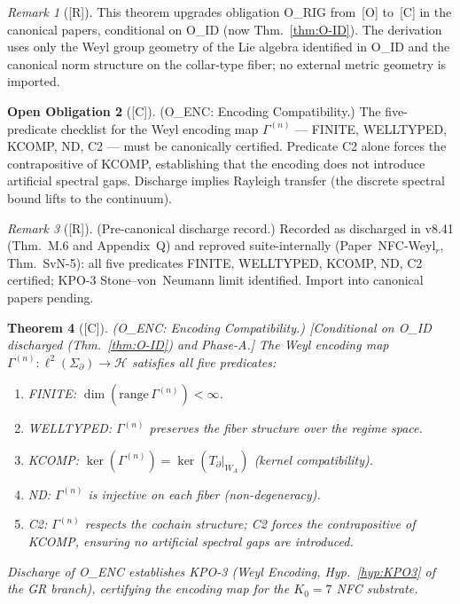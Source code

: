 \documentclass[12pt,oneside]{amsbook}
\theoremstyle{plain}
\newtheorem{theorem}{Theorem}[section]
\theoremstyle{definition}
\newtheorem{obligation}[theorem]{Open Obligation}
\theoremstyle{remark}
\newtheorem{remark}[theorem]{Remark}
\newcommand{\status}[1]{\textup{[#1]}}
\begin{document}
\begin{remark}[\status{R}]
This theorem upgrades obligation O\_RIG from~[O] to~[C] in the
canonical papers, conditional on O\_ID (now Thm.~\ref{thm:O-ID}).
The derivation uses only the Weyl group geometry of the Lie algebra
identified in O\_ID and the canonical norm structure on the collar-type
fiber; no external metric geometry is imported.
\end{remark}

\begin{obligation}[\status{C}]\label{ob:O-ENC}
\textup{(O\_ENC: Encoding Compatibility.)}
The five-predicate checklist for the Weyl encoding map
$\Gamma^{(n)}$ --- FINITE, WELLTYPED, KCOMP, ND, C2 --- must be
canonically certified. Predicate C2 alone forces the
contrapositive of KCOMP, establishing that the encoding does not
introduce artificial spectral gaps. Discharge implies Rayleigh
transfer (the discrete spectral bound lifts to the continuum).
\end{obligation}
\begin{remark}[\status{R}]
\textup{(Pre-canonical discharge record.)} Recorded as discharged in v8.41 (Thm.~M.6 and Appendix~Q)
and reproved suite-internally (Paper~NFC-Weyl$_r$,
Thm.~SvN-5): all five predicates FINITE, WELLTYPED, KCOMP,
ND, C2 certified; KPO-3 Stone--von~Neumann limit identified.
Import into canonical papers pending.
\end{remark}

\begin{theorem}[\status{C}]\label{thm:O-ENC}
\textup{(O\_ENC: Encoding Compatibility.)}
\textup{[Conditional on O\_ID discharged (Thm.~\ref{thm:O-ID})
and Phase-A.]}\;
The Weyl encoding map $\Gamma^{(n)}: \ell^2(\Sigma_\partial)
\to \mathcal{H}$ satisfies all five predicates:
\begin{enumerate}[label=\textup{(\Alph*)}]
 \item \textup{FINITE:} $\dim(\mathrm{range}\,\Gamma^{(n)}) < \infty$.
 \item \textup{WELLTYPED:} $\Gamma^{(n)}$ preserves the fiber
 structure over the regime space.
 \item \textup{KCOMP:} $\ker(\Gamma^{(n)}) = \ker(T_\partial|_{W_A})$
 (kernel compatibility).
 \item \textup{ND:} $\Gamma^{(n)}$ is injective on each fiber
 (non-degeneracy).
 \item \textup{C2:} $\Gamma^{(n)}$ respects the cochain structure;
 C2 forces the contrapositive of KCOMP, ensuring no artificial
 spectral gaps are introduced.
\end{enumerate}
Discharge of O\_ENC establishes KPO-3 (Weyl Encoding,
Hyp.~\ref{hyp:KPO3} of the GR branch), certifying the
encoding map for the $K_0 = 7$ NFC substrate.
\end{theorem}
\end{document}
